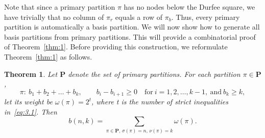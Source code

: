 \documentclass[10pt,a4paper]{amsart}
\numberwithin{equation}{section}
\newtheorem{Theorem}{Theorem}[section]
\theoremstyle{definition}
\begin{document}
Note that since a primary partition $\pi$ has no nodes below the Durfee
square, we have trivially that no column of $\pi_r$ equals a row of
$\pi_b$. Thus, every primary partition is automatically a basis partition.
We will now show how to generate all basis partitions from primary
partitions. This will provide a combinatorial proof of Theorem~\ref{thm:1}.
Before providing this construction, we reformulate Theorem~\ref{thm:1} as follows.

\begin{Theorem}\label{thm:2}
Let $\mathbf{P}$ denote the set of primary partitions. For
each partition $\pi\in \mathbf{P}$,
\begin{equation}
\pi\colon\ b_1+b_2+\dots +b_k, \qquad b_i-b_{i+1}\ge 0 \quad \text{for} \
i=1,2,\dots , k-1, \ \text{and} \ b_k\ge k, \label{eq:3.1}
\end{equation}
let its weight be $\omega(\pi)=2^t$, where t is the number of
strict inequalities in~\eqref{eq:3.1}. Then
\[
b(n,k)=\sum_{\pi\in \mathbf{P},\, \sigma(\pi)=n,\, \nu(\pi)=k}\omega(\pi).
\]
\end{Theorem}
\end{document}
